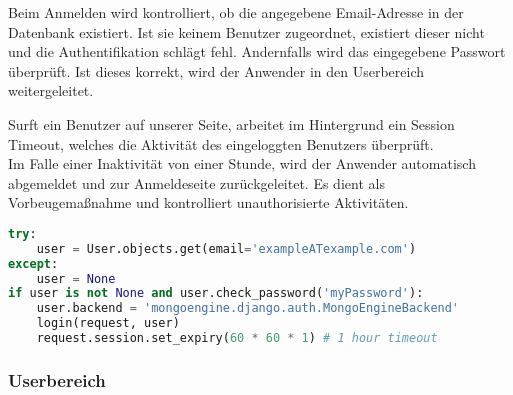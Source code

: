 
Beim Anmelden wird kontrolliert, ob die angegebene Email-Adresse in der Datenbank existiert. Ist sie keinem Benutzer zugeordnet, existiert dieser nicht und die Authentifikation schlägt fehl. Andernfalls wird das eingegebene Passwort überprüft. Ist dieses korrekt, wird der Anwender in den Userbereich weitergeleitet.

Surft ein Benutzer auf unserer Seite, arbeitet im Hintergrund ein Session Timeout, welches die Aktivität des eingeloggten Benutzers überprüft.\\
Im Falle einer Inaktivität von einer Stunde, wird der Anwender automatisch abgemeldet und zur Anmeldeseite zurückgeleitet. Es dient als Vorbeugemaßnahme und kontrolliert unauthorisierte Aktivitäten.

\begin{lstlisting}[caption={Session Timeout}, language=Python]
try:
    user = User.objects.get(email='exampleATexample.com')
except:
    user = None
if user is not None and user.check_password('myPassword'):
    user.backend = 'mongoengine.django.auth.MongoEngineBackend'
    login(request, user)
    request.session.set_expiry(60 * 60 * 1) # 1 hour timeout
\end{lstlisting}
\newpage 

\subsubsection{Userbereich}


